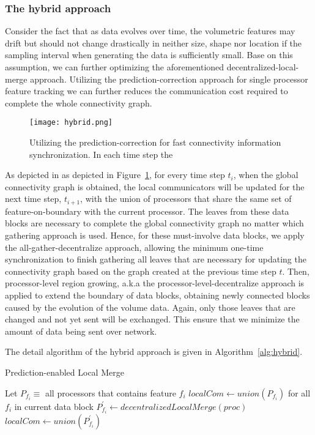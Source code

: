\subsubsection{The hybrid approach}

Consider the fact that as data evolves over time, the volumetric features may drift but should not change drastically in neither size, shape nor location if the sampling interval when generating the data is sufficiently small. Base on this assumption, we can further optimizing the aforementioned decentralized-local-merge approach. Utilizing the prediction-correction approach for single processor feature tracking we can further reduces the communication cost required to complete the whole connectivity graph.

\begin{figure}[ht]
	\centering
	\texttt{[image: hybrid.png]}
	\caption{Utilizing the prediction-correction for fast connectivity information synchronization. In each time step the }
	\label{fig:hybrid}
\end{figure}

As depicted in as depicted in Figure~\ref{fig:hybrid}, for every time step $t_i$, when the global connectivity graph is obtained, the local communicators will be updated for the next time step, $t_{i+1}$, with the union of processors that share the same set of feature-on-boundary with the current processor. The leaves from these data blocks are necessary to complete the global connectivity graph no matter which gathering approach is used. Hence, for these must-involve data blocks, we apply the all-gather-decentralize approach, allowing the minimum one-time synchronization to finish gathering all leaves that are necessary for updating the connectivity graph based on the graph created at the previous time step $t$. Then, processor-level region growing, a.k.a the processor-level-decentralize approach is applied to extend the boundary of data blocks, obtaining newly connected blocks caused by the evolution of the volume data. Again, only those leaves that are changed and not yet sent will be exchanged. This ensure that we minimize the amount of data being sent over network.

The detail algorithm of the hybrid approach is given in Algorithm~\ref{alg:hybrid}.
\begin{algorithm}
\caption{Prediction-enabled Local Merge}
\label{alg:hybrid}
	\begin{algorithmic}
		\STATE Let $P_{f_i} \equiv$ all processors that contains feature $f_i$
			\STATE $localCom \leftarrow union(P_{f_i})$ for all $f_i$ in current data block
		\ELSE
				\STATE $P_{f_i}^{'} \leftarrow decentralizedLocalMerge(proc)$
			\ENDFOR
			\STATE $localCom \leftarrow union(P_{f_i}^{'})$
		\ENDIF
	\end{algorithmic}
\end{algorithm}
